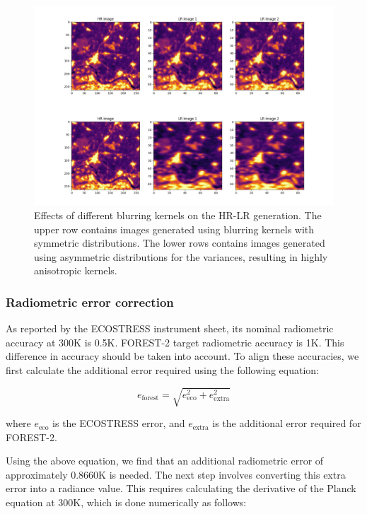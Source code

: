      \begin{figure}[h!]
            \centering
            \includegraphics[width=\linewidth]{Includes/4-degradation-kernel-examples.pdf}
            \caption{Effects of different blurring kernels on the HR-LR generation. The upper row contains images generated using blurring kernels with symmetric distributions. The lower rows contains images generated using asymmetric distributions for the variances, resulting in highly anisotropic kernels.}
            \label{fig:4-degradation_kernels}
        \end{figure}
        
    \subsubsection{Radiometric error correction}

     As reported by the ECOSTRESS instrument sheet,\cite{ECOSTRESS2023INSTRUMENT} its nominal radiometric accuracy at 300K is 0.5K. FOREST-2 target radiometric accuracy is 1K. This difference in accuracy should be taken into account. To align these accuracies, we first calculate the additional error required using the following equation:

    \begin{equation}
        e_{\text{forest}} = \sqrt{e_{\text{eco}}^2 + e_{\text{extra}}^2} 
        \label{eq:4-radiometric-error-correction}
    \end{equation}
    
    where $e_{\text{eco}}$ is the ECOSTRESS error, and $ e_{\text{extra}}$ is the additional error required for FOREST-2.
    
    Using the above equation, we find that an additional radiometric error of approximately 0.8660K is needed. The next step involves converting this extra error into a radiance value. This requires calculating the derivative of the Planck equation at 300K, which is done numerically as follows:
    
